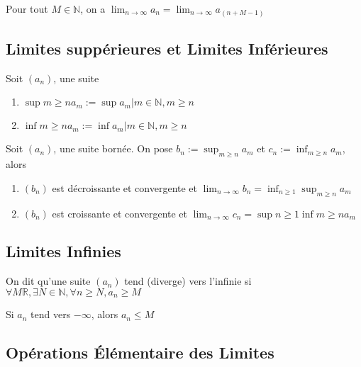 \documentclass{article}
\begin{document}
\begin{theorem}
    Pour tout $M \in \mathbb{N}$, on a $\lim_{n \to \infty} a_n =
    \lim_{n \to \infty} a_(n+M-1)$
\end{theorem}

\subsection{Limites suppérieures et Limites Inférieures}

\begin{definition}
    Soit $(a_n)$, une suite
    \begin{enumerate}
	\item $ \sup{m \geq n} a_m := \sup{a_m | m \in \mathbb{N}, m \geq n}$
	\item $ \inf{m \geq n} a_m := \inf{a_m | m \in \mathbb{N}, m \geq n}$
    \end{enumerate}
\end{definition}

\begin{proposition}
    Soit $(a_n)$, une suite bornée. On pose $b_n := \sup_{m \geq n} a_m$ et
    $c_n := \inf_{m \geq n} a_m$, alors
    \begin{enumerate}
	\item $(b_n)$ est décroissante et convergente et
	    $ \lim_{n \to \infty} b_n = \inf_{n \geq 1} \sup_{m \geq n} a_m$
	\item $(b_n)$ est croissante et convergente et
	    $ \lim_{n \to \infty} c_n = \sup{n \geq 1} \inf{m \geq n} a_m$
    \end{enumerate}
\end{proposition}

\subsection{Limites Infinies}

\begin{definition}
    On dit qu'une suite $(a_n)$ tend (diverge) vers l'infinie si
    $\forall M \mathbb{R}, \exists N \in \mathbb{N}, \forall n \geq N, a_n \geq M$
\end{definition}

\begin{remark}
    Si $a_n$ tend vers $-\infty$, alors $a_n \leq M$
\end{remark}

\subsection{Opérations Élémentaire des Limites}
\end{document}
